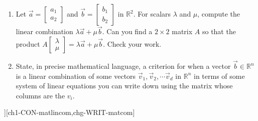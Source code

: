 \begin{SaveQuestion}
{\begin{enumerate}
	   \item Let $\vec a = \begin{bmatrix} a_1\\  a_2 \end{bmatrix}$ and $\vec b =  \begin{bmatrix} b_1 \\ b_2 \end{bmatrix}$ in $\mathbb{R}^2$. For scalars $\lambda$ and $\mu$,   compute the linear combination $\lambda \vec a + \mu \vec b$. Can you find a $2\times 2$ matrix $A$ so that the product $ A \begin{bmatrix} \lambda \\ \mu  \end{bmatrix} = \lambda \vec a + \mu \vec b$. Check your work.
	   \item State,  in precise mathematical language, a criterion  for when a vector $\vec b \in \mathbb{R}^n$ is a linear combination of some vectors $\vec v_1, \vec v_2, \cdots \vec v_d$ in $\mathbb{R}^n$  in terms of some system of linear equations you can write down using the matrix whose columns are the $v_i$. 
        \end{enumerate}
}][ch1-CON-matlincom,chg-WRIT-matcom] %
\end{SaveQuestion}


